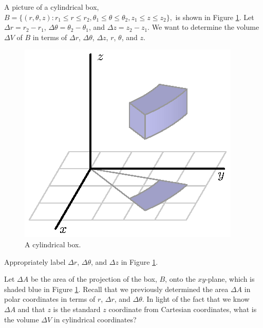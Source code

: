 \begin{activity} \label{A:11.8.2} A picture of a cylindrical box, 
$B = \{(r,\theta,z) : r_1 \leq r \leq r_2, \theta_1 \leq \theta \leq \theta_2, z_1 \leq z \leq z_2\},$
is shown in Figure \ref{F:11.8.Cylindrical_Vol_Element}. Let $\Delta r = r_2-r_1$, $\Delta \theta = \theta_2 - \theta_1$, and $\Delta z = z_2-z_1$. We want to determine the volume $\Delta V$ of $B$ in terms of $\Delta r$, $\Delta \theta$, $\Delta z$, $r$, $\theta$, and $z$.
\begin{figure}[ht]
\begin{center}
  \includegraphics{figures/fig_11_8_cylindrical_box.eps}
\end{center}
\caption{A cylindrical box.}
\label{F:11.8.Cylindrical_Vol_Element}
\end{figure}

    \ba
    \item Appropriately label $\Delta r$, $\Delta \theta$, and $\Delta z$ in Figure \ref{F:11.8.Cylindrical_Vol_Element}.



    \item Let $\Delta A$ be the area of the projection of the box, $B$, onto the $xy$-plane, which is shaded blue in Figure \ref{F:11.8.Cylindrical_Vol_Element}.  Recall that we previously determined the area $\Delta A$ in polar coordinates in terms of $r$, $\Delta r$, and $\Delta \theta$. In light of the fact that we know $\Delta A$ and that $z$ is the standard $z$ coordinate from Cartesian coordinates, what is the volume $\Delta V$ in cylindrical coordinates?



    \ea


\end{activity}
